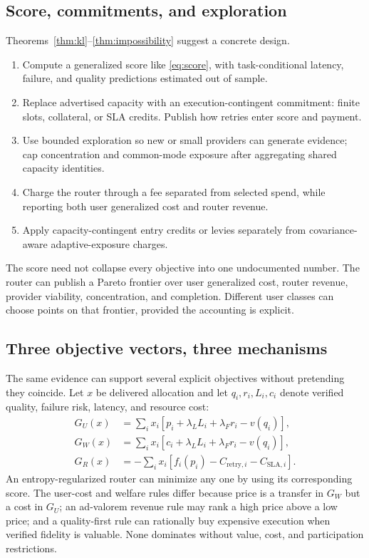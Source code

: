 \documentclass[sigconf,nonacm]{acmart}
\newcommand{\1}{\mathbf 1}
\begin{document}
\subsection{Score, commitments, and exploration}

Theorems~\ref{thm:kl}--\ref{thm:impossibility} suggest a concrete design.

\begin{enumerate}[leftmargin=*,nosep]
\item Compute a generalized score like \eqref{eq:score}, with task-conditional
latency, failure, and quality predictions estimated out of sample.
\item Replace advertised capacity with an execution-contingent commitment:
finite slots, collateral, or SLA credits.  Publish how retries enter score and
payment.
\item Use bounded exploration so new or small providers can generate evidence;
cap concentration and common-mode exposure after aggregating shared capacity
identities.
\item Charge the router through a fee separated from selected spend, while
reporting both user generalized cost and router revenue.
\item Apply capacity-contingent entry credits or levies separately from
covariance-aware adaptive-exposure charges.
\end{enumerate}

The score need not collapse every objective into one undocumented number.  The
router can publish a Pareto frontier over user generalized cost, router revenue,
provider viability, concentration, and completion.  Different user classes can
choose points on that frontier, provided the accounting is explicit.

\subsection{Three objective vectors, three mechanisms}

The same evidence can support several explicit objectives without pretending
they coincide.  Let $x$ be delivered allocation and let $q_i,r_i,L_i,c_i$ denote
verified quality, failure risk, latency, and resource cost:
\begin{align}
G_U(x)&=\sum_i x_i[p_i+\lambda_LL_i+\lambda_Fr_i-v(q_i)],\\
G_W(x)&=\sum_i x_i[c_i+\lambda_LL_i+\lambda_Fr_i-v(q_i)],\\
G_R(x)&=-\sum_i x_i[f_i(p_i)-C_{\mathrm{retry},i}-C_{\mathrm{SLA},i}].
\label{eq:threeobjectives}
\end{align}
An entropy-regularized router can minimize any one by using its corresponding
score.  The user-cost and welfare rules differ because price is a transfer in
$G_W$ but a cost in $G_U$; an ad-valorem revenue rule may rank a high price above
a low price; and a quality-first rule can rationally buy expensive execution
when verified fidelity is valuable.  None dominates without value, cost, and
participation restrictions.
\end{document}
